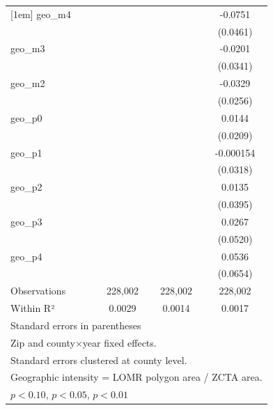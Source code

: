 \begin{table}[htbp]
\begin{tabular}{l*{3}{c}}
[1em]
geo\_m4              &                     &                     &     -0.0751         \\
                    &                     &                     &    (0.0461)         \\
[1em]
geo\_m3              &                     &                     &     -0.0201         \\
                    &                     &                     &    (0.0341)         \\
[1em]
geo\_m2              &                     &                     &     -0.0329         \\
                    &                     &                     &    (0.0256)         \\
[1em]
geo\_p0              &                     &                     &      0.0144         \\
                    &                     &                     &    (0.0209)         \\
[1em]
geo\_p1              &                     &                     &   -0.000154         \\
                    &                     &                     &    (0.0318)         \\
[1em]
geo\_p2              &                     &                     &      0.0135         \\
                    &                     &                     &    (0.0395)         \\
[1em]
geo\_p3              &                     &                     &      0.0267         \\
                    &                     &                     &    (0.0520)         \\
[1em]
geo\_p4              &                     &                     &      0.0536         \\
                    &                     &                     &    (0.0654)         \\
\hline
Observations        &     228,002         &     228,002         &     228,002         \\
Within R²           &      0.0029         &      0.0014         &      0.0017         \\
\hline\hline
\multicolumn{4}{l}{\footnotesize Standard errors in parentheses}\\
\multicolumn{4}{l}{\footnotesize Zip and county×year fixed effects.}\\
\multicolumn{4}{l}{\footnotesize Standard errors clustered at county level.}\\
\multicolumn{4}{l}{\footnotesize Geographic intensity = LOMR polygon area / ZCTA area.}\\
\multicolumn{4}{l}{\footnotesize \sym{*} \(p<0.10\), \sym{**} \(p<0.05\), \sym{***} \(p<0.01\)}\\
\end{tabular}
\end{table}
